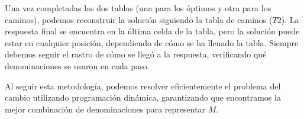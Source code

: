 \documentclass[tikz,11pt,fleqn]{book} %
\begin{document}
Una vez completadas las dos tablas (una para los óptimos y otra para los caminos), podemos reconstruir la solución siguiendo la tabla de caminos ($T2$). La respuesta final se encuentra en la última celda de la tabla, pero la solución puede estar en cualquier posición, dependiendo de cómo se ha llenado la tabla. Siempre debemos seguir el rastro de cómo se llegó a la respuesta, verificando qué denominaciones se usaron en cada paso.

Al seguir esta metodología, podemos resolver eficientemente el problema del cambio utilizando programación dinámica, garantizando que encontramos la mejor combinación de denominaciones para representar $M$.




                







\end{document}
